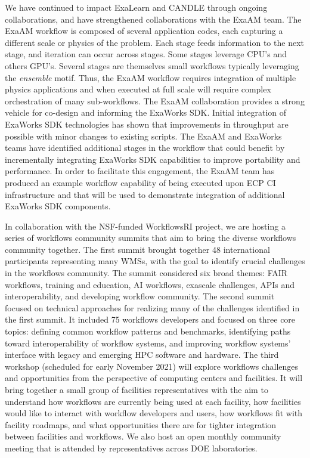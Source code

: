 We have continued to impact ExaLearn and CANDLE through ongoing
collaborations, and have strengthened collaborations with the ExaAM team. The
ExaAM workflow is composed of several application codes, each capturing a
different scale or physics of the problem.  Each stage feeds
information to the next stage, and iteration can occur across stages.  Some
stages leverage CPU's and others GPU's. Several stages are themselves small
workflows typically leveraging the \textit{ensemble} motif. Thus, the ExaAM
workflow requires integration of multiple physics applications and when
executed at full scale will require complex orchestration of many
sub-workflows.  The ExaAM collaboration provides a strong vehicle for co-design and informing the 
ExaWorks SDK. Initial integration of ExaWorks SDK technologies has shown that
improvements in throughput are possible with minor changes to existing scripts.
The ExaAM and ExaWorks teams have identified additional stages in the workflow
that could benefit by incrementally integrating ExaWorks SDK capabilities to
improve portability and performance.  In order to facilitate this engagement,
the ExaAM team has produced an example workflow capability of being executed
upon ECP CI infrastructure and that will be used to demonstrate integration of additional
ExaWorks SDK components.

In collaboration with the NSF-funded WorkflowsRI project, we are hosting a
series of workflows community summits that aim to bring the diverse workflows
community together. The first summit brought together 48 international
participants representing many WMSs, with the goal to identify crucial
challenges in the workflows community. The summit considered six broad themes:
FAIR workflows, training and education, AI workflows, exascale challenges,
APIs and interoperability, and developing workflow community. The second
summit~\cite{summit_1} focused on technical approaches for realizing many of
the challenges identified in the first summit. It included 75 workflows
developers %
and focused on three core topics: defining common workflow patterns and
benchmarks, identifying paths toward interoperability of workflow systems, and
improving workflow systems’ interface with legacy and emerging HPC software
and hardware. The third workshop (scheduled for early November 2021) will
explore workflows challenges and opportunities from the perspective of
computing centers and facilities.  It will bring together a small group of
facilities representatives with the aim to understand how workflows are
currently being used at each facility, how facilities would like to interact
with workflow developers and users, how workflows fit with facility roadmaps,
and what opportunities there are for tighter integration between facilities
and workflows. We also host an open monthly community meeting that is attended
by representatives across DOE laboratories. 

